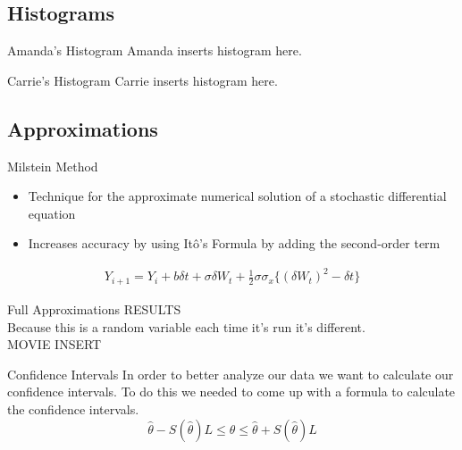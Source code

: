 
\subsection{Histograms}

\begin{frame}{Amanda's Histogram}
Amanda inserts histogram here. 
\end{frame}

\begin{frame}{Carrie's Histogram}
Carrie inserts histogram here. 
\end{frame}



\subsection{Approximations}

\begin{frame}{Milstein Method}
	\begin{itemize}
		\item Technique for the approximate numerical solution of a stochastic differential equation
		\item Increases accuracy by using It\^o's Formula by adding the second-order term
	\end{itemize} 

	\begin{align*}
		Y_{i+1} = Y_i +b\delta t + \sigma \delta W_t + \frac{1}{2} \sigma \sigma_x \{(\delta W_t)^2 - \delta t\} 
	\end{align*}

\end{frame}

\begin{frame}{Full Approximations}
RESULTS \\
Because this is a random variable each time it's run it's different. \\
MOVIE INSERT 
\end{frame}

\begin{frame}{Confidence Intervals}
In order to better analyze our data we want to calculate our confidence intervals. To do this we needed to come up with a formula to calculate the confidence intervals. \\
$$\hat{\theta} - S(\hat{\theta}) L \leq \theta \leq \hat{\theta} + S(\hat{\theta}) L$$
\end{frame}

